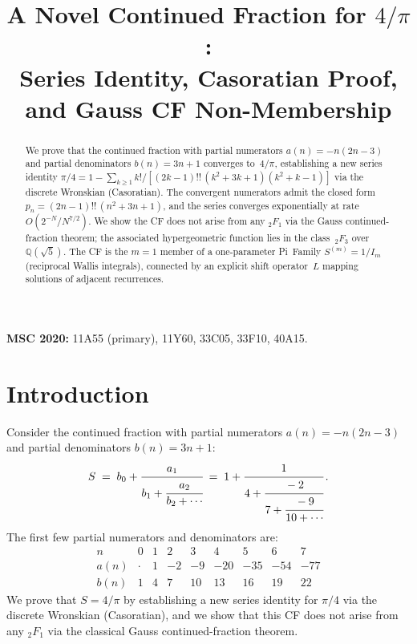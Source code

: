 \documentclass[11pt]{article}
\title{A Novel Continued Fraction for $4/\pi$:\\
Series Identity, Casoratian Proof, and Gauss CF Non-Membership}
\author{}
\date{}
\theoremstyle{remark}
\begin{document}
\maketitle

\begin{abstract}
We prove that the continued fraction with partial numerators
$a(n) = -n(2n{-}3)$ and partial denominators $b(n) = 3n{+}1$
converges to~$4/\pi$, establishing a new series identity
$\pi/4 = 1 - \sum_{k \geq 1} k!/[(2k{-}1)!!\,(k^2{+}3k{+}1)(k^2{+}k{-}1)]$
via the discrete Wronskian (Casoratian).
The convergent numerators admit the closed form
$p_n = (2n{-}1)!!\,(n^2{+}3n{+}1)$, and the series converges
exponentially at rate~$O(2^{-N}/N^{7/2})$.
We show the CF does not arise from any ${}_2F_1$ via the Gauss
continued-fraction theorem; the associated hypergeometric
function lies in the class~${}_2F_3$ over~$\mathbb{Q}(\sqrt5)$.
The CF is the $m{=}1$ member of a one-parameter Pi~Family
$S^{(m)} = 1/I_m$ (reciprocal Wallis integrals), connected by an
explicit shift operator~$L$ mapping solutions of adjacent
recurrences.
\end{abstract}

\noindent\textbf{MSC 2020:}
11A55 (primary), 11Y60, 33C05, 33F10, 40A15.

\section{Introduction}\label{sec:intro}

Consider the continued fraction with partial numerators $a(n)=-n(2n-3)$
and partial denominators $b(n)=3n+1$:
\begin{equation}\label{eq:cf}
  S \;=\; b_0 + \cfrac{a_1}{b_1 + \cfrac{a_2}{b_2 + \cdots}}
  \;=\; 1 + \cfrac{1}{4 + \cfrac{-2}{7 + \cfrac{-9}{10 + \cdots}}}\,.
\end{equation}
The first few partial numerators and denominators are:
\[
  \begin{array}{r|rrrrrrrr}
    n & 0 & 1 & 2 & 3 & 4 & 5 & 6 & 7 \\
    \hline
    a(n) & \cdot & 1 & -2 & -9 & -20 & -35 & -54 & -77 \\
    b(n) & 1 & 4 & 7 & 10 & 13 & 16 & 19 & 22
  \end{array}
\]
We prove that $S = 4/\pi$ by establishing a new series identity
for $\pi/4$ via the discrete Wronskian (Casoratian), and we show
that this CF does not arise from any ${}_2F_1$ via the classical
Gauss continued-fraction theorem.
\end{document}

